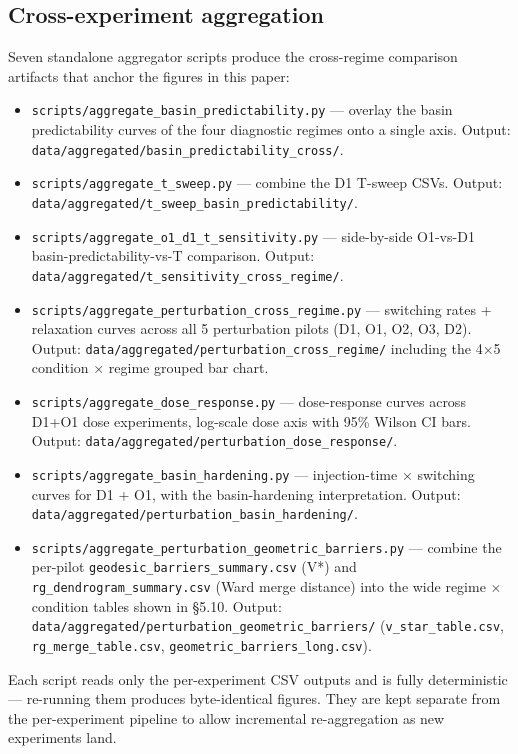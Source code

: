 \documentclass{article}
\theoremstyle{plain}
\theoremstyle{definition}
\begin{document}
\subsection{Cross-experiment aggregation}

Seven standalone aggregator scripts produce the cross-regime comparison
artifacts that anchor the figures in this paper:

\begin{itemize}
  \item \texttt{scripts/aggregate\_basin\_predictability.py} — overlay the basin
  predictability curves of the four diagnostic regimes onto a single
  axis. Output: \texttt{data/aggregated/basin\_predictability\_cross/}.
  \item \texttt{scripts/aggregate\_t\_sweep.py} — combine the D1 T-sweep CSVs.
  Output: \texttt{data/aggregated/t\_sweep\_basin\_predictability/}.
  \item \texttt{scripts/aggregate\_o1\_d1\_t\_sensitivity.py} — side-by-side O1-vs-D1
  basin-predictability-vs-T comparison. Output:
  \texttt{data/aggregated/t\_sensitivity\_cross\_regime/}.
  \item \texttt{scripts/aggregate\_perturbation\_cross\_regime.py} — switching rates +
  relaxation curves across all 5 perturbation pilots (D1, O1, O2, O3, D2).
  Output: \texttt{data/aggregated/perturbation\_cross\_regime/} including the
  4×5 condition × regime grouped bar chart.
  \item \texttt{scripts/aggregate\_dose\_response.py} — dose-response curves across
  D1+O1 dose experiments, log-scale dose axis with 95\% Wilson CI bars.
  Output: \texttt{data/aggregated/perturbation\_dose\_response/}.
  \item \texttt{scripts/aggregate\_basin\_hardening.py} — injection-time × switching
  curves for D1 + O1, with the basin-hardening interpretation.
  Output: \texttt{data/aggregated/perturbation\_basin\_hardening/}.
  \item \texttt{scripts/aggregate\_perturbation\_geometric\_barriers.py} — combine the
  per-pilot \texttt{geodesic\_barriers\_summary.csv} (V*) and
  \texttt{rg\_dendrogram\_summary.csv} (Ward merge distance) into the wide
  regime × condition tables shown in §5.10. Output:
  \texttt{data/aggregated/perturbation\_geometric\_barriers/}
  (\texttt{v\_star\_table.csv}, \texttt{rg\_merge\_table.csv}, \texttt{geometric\_barriers\_long.csv}).
\end{itemize}

Each script reads only the per-experiment CSV outputs and is fully
deterministic — re-running them produces byte-identical figures. They
are kept separate from the per-experiment pipeline to allow incremental
re-aggregation as new experiments land.
\end{document}
